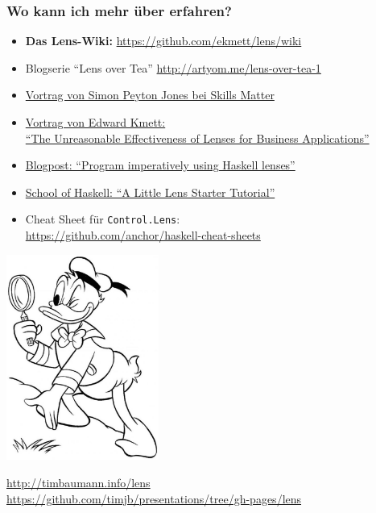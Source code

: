 \documentclass{beamer}
\begin{document}
\begin{frame}[fragile,t]
  \frametitle{Wo kann ich mehr über  erfahren?}
  \begin{itemize}
    \item \textbf{Das Lens-Wiki:} \url{https://github.com/ekmett/lens/wiki}
    \item Blogserie ``Lens over Tea'' \url{http://artyom.me/lens-over-tea-1}
    \item \href{https://skillsmatter.com/skillscasts/4251-lenses-compositional-data-access-and-manipulation}{Vortrag von Simon Peyton Jones bei Skills Matter}
    \item \href{https://youtu.be/T88TDS7L5DY}{Vortrag von Edward Kmett: \\ ``The Unreasonable Effectiveness of Lenses for Business Applications''}
    \item \href{http://www.haskellforall.com/2013/05/program-imperatively-using-haskell.html}{Blogpost: ``Program imperatively using Haskell lenses''}
    \item \href{https://www.fpcomplete.com/school/to-infinity-and-beyond/pick-of-the-week/a-little-lens-starter-tutorial}{School of Haskell: ``A Little Lens Starter Tutorial''}
    \item Cheat Sheet für \verb|Control.Lens|: \\
    \url{https://github.com/anchor/haskell-cheat-sheets}
  \end{itemize}
\end{frame}


{
\begin{frame}[b]
  \begin{center}
    \includegraphics[width=5cm,keepaspectratio]{images/donald-detective.jpg} \\
  \end{center}

  \centering \small
  \url{http://timbaumann.info/lens} \\
  \url{https://github.com/timjb/presentations/tree/gh-pages/lens}
\end{frame}}
\end{document}
